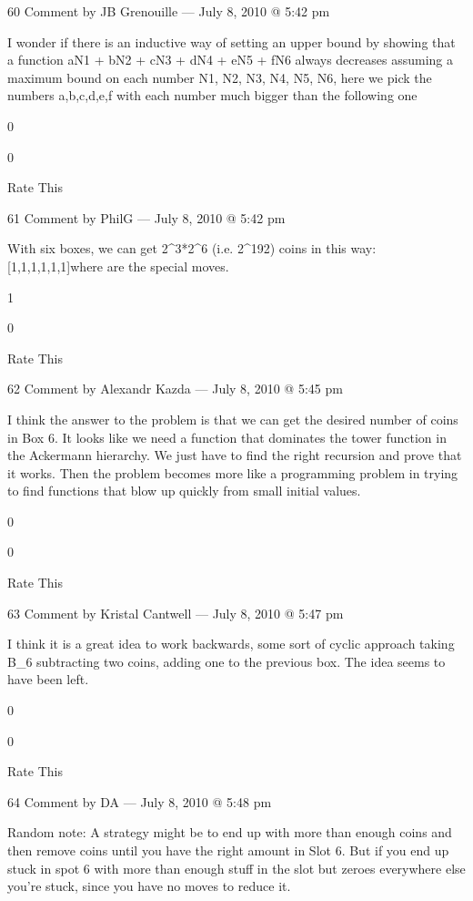     60 Comment by JB Grenouille — July 8, 2010 @ 5:42 pm

    I wonder if there is an inductive way of setting an upper bound by showing that a function aN1 + bN2 + cN3 + dN4 + eN5 + fN6 always decreases assuming a maximum bound on each number N1, N2, N3, N4, N5, N6, here we pick the numbers a,b,c,d,e,f with each number much bigger than the following one
     
    0
     
    0
     
    Rate This

    61 Comment by PhilG — July 8, 2010 @ 5:42 pm

    With six boxes, we can get 2^{3*2^6} (i.e. 2^{192}) coins in this way:
    [1,1,1,1,1,1]\to\to [0,0,7,1,1,1]\to [0,0,7,0,3,1]\to\to [0,0,1,0,3*2^6,1]\to [0,0,0,3*2^6,0,1]\to [0,0,0,0,0,2^{3*2^6}] where \to\to are the special moves.
     
    1
     
    0
     
    Rate This

    62 Comment by Alexandr Kazda — July 8, 2010 @ 5:45 pm

    I think the answer to the problem is that we can get the desired
    number of coins in Box 6. It looks like we need a function that
    dominates the tower function in the Ackermann hierarchy. We just
    have to find the right recursion and prove that it works. Then the
    problem becomes more like a programming problem in trying to find
    functions that blow up quickly from small initial values.
     
    0
     
    0
     
    Rate This

    63 Comment by Kristal Cantwell — July 8, 2010 @ 5:47 pm

    I think it is a great idea to work backwards, some sort of cyclic approach taking B_6 subtracting two coins, adding one to the previous box. The idea seems to have been left.
     
    0
     
    0
     
    Rate This

    64 Comment by DA — July 8, 2010 @ 5:48 pm

    Random note: A strategy might be to end up with more than enough coins and then remove coins until you have the right amount in Slot 6. But if you end up stuck in spot 6 with more than enough stuff in the slot but zeroes everywhere else you’re stuck, since you have no moves to reduce it.

